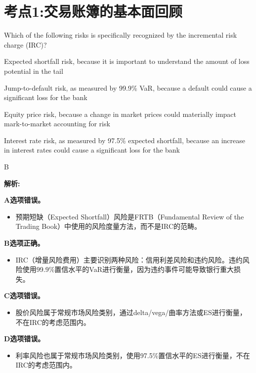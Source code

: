 \documentclass{article}
\newcounter{question} %
\newenvironment{explanation}
{\textbf{解析:}\par}
{\par}
\begin{document}
 \tableofcontents %
\newpage




\section{考点1:交易账簿的基本面回顾}
\setcounter{question}{0}

\begin{question}
    Which of the following risks is specifically recognized by the incremental risk charge (IRC)?
    \end{question}
    
    \begin{choices}
        \item Expected shortfall risk, because it is important to understand the amount of loss potential in the tail
        \item Jump-to-default risk, as measured by 99.9\% VaR, because a default could cause a significant loss for the bank
        \item Equity price risk, because a change in market prices could materially impact mark-to-market accounting for risk
        \item Interest rate risk, as measured by 97.5\% expected shortfall, because an increase in interest rates could cause a significant loss for the bank
    \end{choices}
    
    \begin{correctanswer}
        B
    \end{correctanswer}
    
    \begin{explanation}
        \textbf{A选项错误。}
        \begin{itemize}
            \item 预期短缺（Expected Shortfall）风险是FRTB（Fundamental Review of the Trading Book）中使用的风险度量方法，而不是IRC的范畴。
        \end{itemize}
        
        \textbf{B选项正确。}
        \begin{itemize}
            \item IRC（增量风险费用）主要识别两种风险：信用利差风险和违约风险。违约风险使用99.9\%置信水平的VaR进行衡量，因为违约事件可能导致银行重大损失。
        \end{itemize}
        
        \textbf{C选项错误。}
        \begin{itemize}
            \item 股价风险属于常规市场风险类别，通过delta/vega/曲率方法或ES进行衡量，不在IRC的考虑范围内。
        \end{itemize}
        
        \textbf{D选项错误。}
        \begin{itemize}
            \item 利率风险也属于常规市场风险类别，使用97.5\%置信水平的ES进行衡量，不在IRC的考虑范围内。
        \end{itemize}
    \end{explanation}
    
\end{document}

